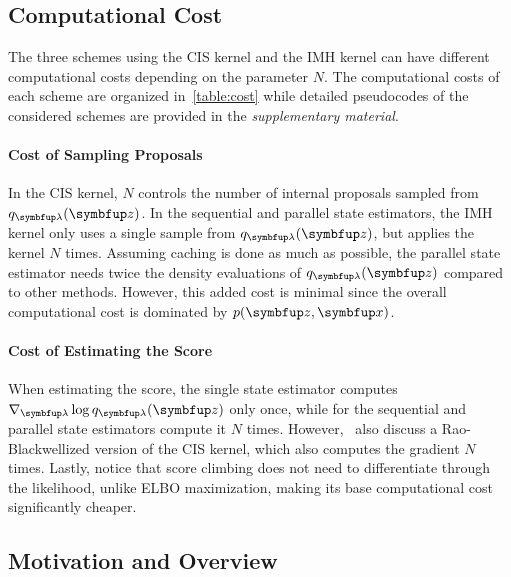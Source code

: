 \vspace{-0.05in}
\subsection{Computational Cost}
\vspace{-0.05in}
The three schemes using the CIS kernel and the IMH kernel can have different computational costs depending on the parameter \(N\).
The computational costs of each scheme are organized in~\cref{table:cost} while detailed pseudocodes of the considered schemes are provided in the \textit{supplementary material}.

\vspace{-0.05in}
\paragraph{Cost of Sampling Proposals}
In the CIS kernel, \(N\) controls the number of internal proposals sampled from \(q_{\vlambda}(\vz)\).
In the sequential and parallel state estimators, the IMH kernel only uses a single sample from \(q_{\vlambda}(\vz)\), but applies the kernel \(N\) times.
Assuming caching is done as much as possible, the parallel state estimator needs twice the density evaluations of \(q_{\vlambda}(\vz)\) compared to other methods.
However, this added cost is minimal since the overall computational cost is dominated by  \(p(\vz,\vx)\).

\vspace{-0.05in}
\paragraph{Cost of Estimating the Score}
When estimating the score, the single state estimator computes \(\nabla_{\vlambda} \log q_{\vlambda}(\vz)\) only once, while for the sequential and parallel state estimators compute it \(N\) times.
However,~\cite{NEURIPS2020_b2070693} also discuss a Rao-Blackwellized version of the CIS kernel, which also computes the gradient \(N\) times.
Lastly, notice that score climbing does not need to differentiate through the likelihood, unlike ELBO maximization, making its base computational cost significantly cheaper.

\vspace{-0.05in}
\subsection{Motivation and Overview}\label{section:motivation}
\vspace{-0.05in}
